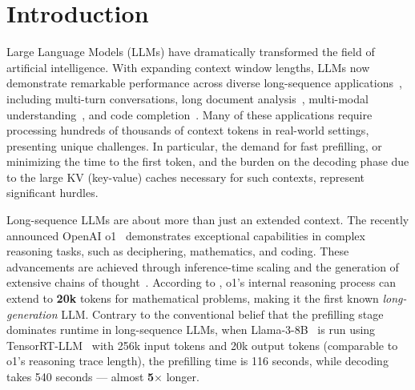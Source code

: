 \section{Introduction}
\label{sect:intro}



Large Language Models (LLMs) have dramatically transformed the field of artificial intelligence. With expanding context window lengths, LLMs now demonstrate remarkable performance across diverse long-sequence applications~\cite{google2024gemini}, including multi-turn conversations, long document analysis~\cite{zhang2024benchmarking, goyal2020evaluating, huang2021efficient}, multi-modal understanding~\cite{xue2024longvila, liu2024visual, lin2024vila}, and code completion~\cite{li2023starcoder, lozhkov2024starcoder}. Many of these applications require processing hundreds of thousands of context tokens in real-world settings, presenting unique challenges. In particular, the demand for fast prefilling, or minimizing the time to the first token, and the burden on the decoding phase due to the large KV (key-value) caches necessary for such contexts, represent significant hurdles.




Long-sequence LLMs are about more than just an extended context. The recently announced OpenAI o1~\cite{openai2024o1} demonstrates exceptional capabilities in complex reasoning tasks, such as deciphering, mathematics, and coding. These advancements are achieved through inference-time scaling and the generation of extensive chains of thought~\cite{wei2022chain}. According to \citet{qin2024o1}, o1's internal reasoning process can extend to \textbf{20k} tokens for mathematical problems, making it the first known \textit{long-generation} LLM. Contrary to the conventional belief that the prefilling stage dominates runtime in long-sequence LLMs, when Llama-3-8B~\cite{dubey2024llama} is run using TensorRT-LLM~\cite{trtllm} with 256k input tokens and 20k output tokens (comparable to o1’s reasoning trace length), the prefilling time is 116 seconds, while decoding takes 540 seconds — almost \textbf{5$\times$} longer.





